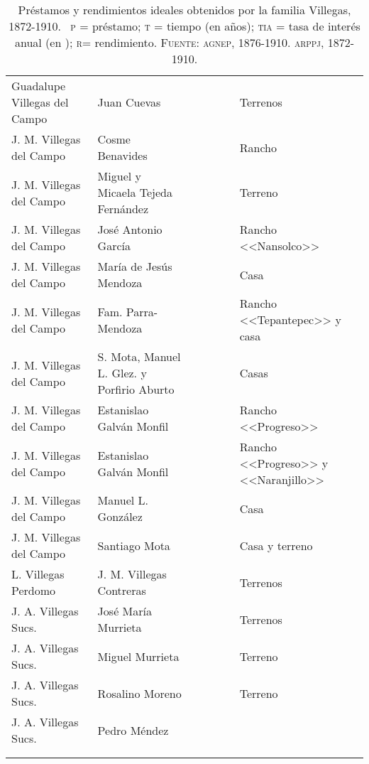 \documentclass[14pt,twoside,final]{extbook} %
\begin{document}
{\begin{longtable}[c]{@{}p{2.5cm}lrSrrl@{}}
Guadalupe Villegas del Campo & Juan Cuevas &  &  & {} & {} & Terrenos \\
J. M. Villegas del Campo & Cosme Benavides &  &  &  &  & Rancho \\
J. M. Villegas del Campo & Miguel y Micaela Tejeda Fernández &  & {} & {} & {} & Terreno \\
J. M. Villegas del Campo & José Antonio García &  &  &  &  & Rancho <<Nansolco>> \\
J. M. Villegas del Campo & María de Jesús Mendoza &  &  &  &  & Casa \\
J. M. Villegas del Campo & Fam. Parra-Mendoza &  &  &  &  & Rancho <<Tepantepec>> y casa \\
J. M. Villegas del Campo & S. Mota, Manuel L. Glez. y Porfirio Aburto &  &  &  &  & Casas \\
J. M. Villegas del Campo & Estanislao Galván Monfil &  &  & {} & {} & Rancho <<Progreso>> \\
J. M. Villegas del Campo & Estanislao Galván Monfil &  & {} & {} & {} & Rancho <<Progreso>> y <<Naranjillo>> \\
J. M. Villegas del Campo & Manuel L. González &  &  &  &  & Casa \\
J. M. Villegas del Campo & Santiago Mota &  &  &  &  & Casa y terreno \\
L. Villegas Perdomo & J. M. Villegas Contreras &  & {} & {} & {} & Terrenos \\
J. A. Villegas Sucs. & José María Murrieta &  &  &  &  & Terrenos \\
J. A. Villegas Sucs. & Miguel Murrieta &  & {} & {} & {} & Terreno \\
J. A. Villegas Sucs. & Rosalino Moreno &  & {} & {} & {} & Terreno \\
J. A. Villegas Sucs. & Pedro Méndez &  & {} & {} & {} & {} \\
{} & {} &  & {} & {} &  & {} \\
\caption[Préstamos y rendimientos ideales obtenidos por la familia Villegas, 1872-1910]{Préstamos y rendimientos ideales obtenidos por la familia Villegas, 1872-1910. ~\textsc{p} = préstamo;  \textsc{t} = tiempo (en años);  \textsc{tia} = tasa de interés anual (en );  \textsc{r}= rendimiento. \textsc{Fuente:} \textsc{agnep}, 1876-1910. \textsc{arppj}, 1872-1910.}
\label{tab:prestamos-y-rendimientos}
\end{longtable}
}%
\end{document}
